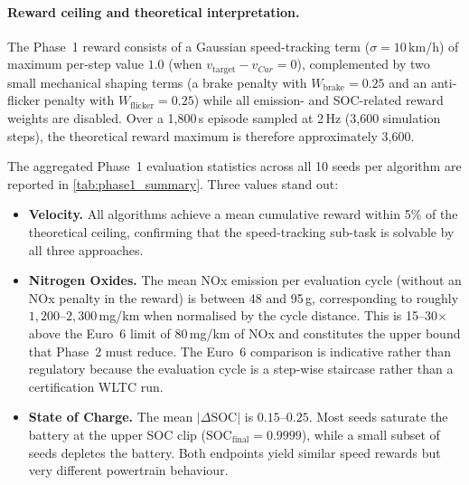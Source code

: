 \paragraph{Reward ceiling and theoretical interpretation.} The Phase~1 reward consists of a Gaussian speed-tracking term ($\sigma = 10$\,km/h) of maximum per-step value $1.0$ (when $v_{\mathrm{target}}-v_{Car}=0$), complemented by two small mechanical shaping terms (a brake penalty with $W_{\text{brake}} = 0.25$ and an anti-flicker penalty with $W_{\text{flicker}} = 0.25$) while all emission- and \ac{SOC}-related reward weights are disabled. Over a 1{,}800\,s episode sampled at 2\,Hz (3{,}600 simulation steps), the theoretical reward maximum is therefore approximately 3{,}600.

The aggregated Phase~1 evaluation statistics across all 10 seeds per algorithm are reported in \autoref{tab:phase1_summary}. Three values stand out:
\begin{itemize}
  \item \textbf{Velocity.} All algorithms achieve a mean cumulative reward within 5\% of the theoretical ceiling, confirming that the speed-tracking sub-task is solvable by all three approaches.
  \item \textbf{Nitrogen Oxides.} The mean \ac{NOx} emission per evaluation cycle (without an \ac{NOx} penalty in the reward) is between 48 and 95\,g, corresponding to roughly $1{,}200$--$2{,}300$\,mg/km when normalised by the cycle distance. This is 15--30$\times$ above the Euro~6 limit of $80$\,mg/km of \ac{NOx} and constitutes the upper bound that Phase~2 must reduce. The Euro~6 comparison is indicative rather than regulatory because the evaluation cycle is a step-wise staircase rather than a certification \ac{WLTC} run.
  \item \textbf{State of Charge.} The mean $|\Delta \text{SOC}|$ is $0.15$--$0.25$. Most seeds saturate the battery at the upper \ac{SOC} clip ($\text{SOC}_{\text{final}} = 0.9999$), while a small subset of seeds depletes the battery. Both endpoints yield similar speed rewards but very different powertrain behaviour.
\end{itemize}

